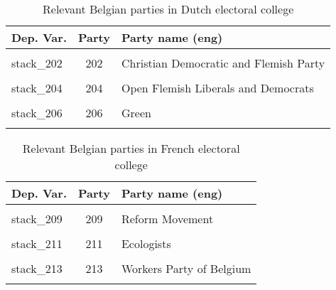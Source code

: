 \documentclass[
]{article}
\begin{document}
\begin{table}[!h]

\caption{\label{tab:unnamed-chunk-10}Relevant Belgian parties in Dutch electoral college \label{table:relprty_tab_be_du}}
\centering
\begin{tabular}[t]{lcl}
\toprule
Dep. Var. & Party & Party name (eng)\\
\midrule
\cellcolor{gray!6}{stack\_201} & \cellcolor{gray!6}{201} & \cellcolor{gray!6}{Workers Party of Belgium}\\
stack\_202 & 202 & Christian Democratic and Flemish Party\\
\cellcolor{gray!6}{stack\_203} & \cellcolor{gray!6}{203} & \cellcolor{gray!6}{Socialist Party Different}\\
stack\_204 & 204 & Open Flemish Liberals and Democrats\\
\cellcolor{gray!6}{stack\_205} & \cellcolor{gray!6}{205} & \cellcolor{gray!6}{New Flemish Alliance}\\
\addlinespace
stack\_206 & 206 & Green\\
\cellcolor{gray!6}{stack\_207} & \cellcolor{gray!6}{207} & \cellcolor{gray!6}{Flemish Interest}\\
\bottomrule
\end{tabular}
\end{table}

\begin{table}[!h]

\caption{\label{tab:unnamed-chunk-10}Relevant Belgian parties in French electoral college \label{table:relprty_tab_be_fr}}
\centering
\begin{tabular}[t]{lcl}
\toprule
Dep. Var. & Party & Party name (eng)\\
\midrule
\cellcolor{gray!6}{stack\_208} & \cellcolor{gray!6}{208} & \cellcolor{gray!6}{Francophone Socialist Party}\\
stack\_209 & 209 & Reform Movement\\
\cellcolor{gray!6}{stack\_210} & \cellcolor{gray!6}{210} & \cellcolor{gray!6}{Humanist Democratic Centre}\\
stack\_211 & 211 & Ecologists\\
\cellcolor{gray!6}{stack\_212} & \cellcolor{gray!6}{212} & \cellcolor{gray!6}{National Front (Belgium)}\\
\addlinespace
stack\_213 & 213 & Workers Party of Belgium\\
\cellcolor{gray!6}{stack\_214} & \cellcolor{gray!6}{214} & \cellcolor{gray!6}{Francophone Democratic Federalists}\\
\bottomrule
\end{tabular}
\end{table}
\end{document}

